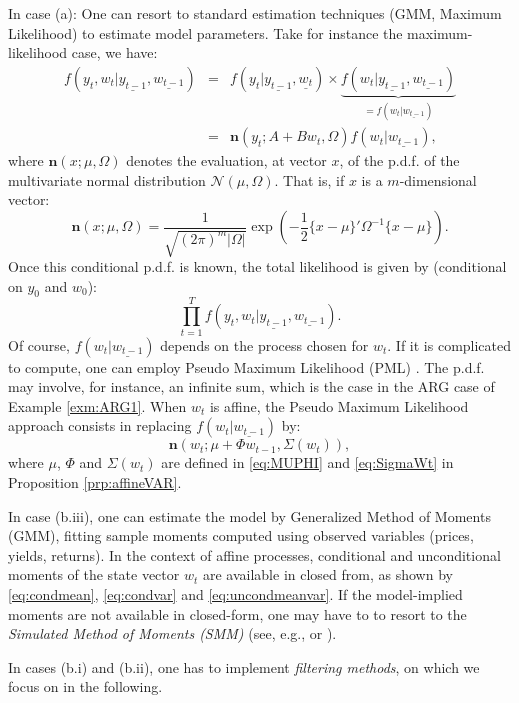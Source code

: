 \documentclass[
  12pt,
]{book}
\theoremstyle{definition}
\theoremstyle{definition}
\theoremstyle{definition}
\theoremstyle{definition}
\theoremstyle{remark}
\begin{document}
In case (a): One can resort to standard estimation techniques (GMM, Maximum Likelihood) to estimate model parameters. Take for instance the maximum-likelihood case, we have:
\begin{eqnarray*}
f(y_t,w_t|\underline{y_{t-1}},\underline{w_{t-1}}) &=& f(y_t|\underline{y_{t-1}},\underline{w_{t}}) \times \underbrace{f(w_t|\underline{y_{t-1}},\underline{w_{t-1}})}_{= f(w_t|\underline{w_{t-1}})}\\
&=& \mathbf{n}(y_t;A + Bw_t,\Omega) f(w_t|\underline{w_{t-1}}),
\end{eqnarray*}
where \(\mathbf{n}(x;\mu,\Omega)\) denotes the evaluation, at vector \(x\), of the p.d.f. of the multivariate normal distribution \(\mathcal{N}(\mu,\Omega)\). That is, if \(x\) is a \(m\)-dimensional vector:
\begin{equation}
\mathbf{n}(x;\mu,\Omega) = \frac{1}{\sqrt{(2 \pi)^{m}|\Omega|}} \exp\left(-\frac{1}{2}\{x - \mu\}'\Omega^{-1}\{x-\mu\}\right).\label{eq:varPHI}
\end{equation}
Once this conditional p.d.f. is known, the total likelihood is given by (conditional on \(y_0\) and \(w_0\)):
\[
\prod_{t=1}^T f(y_t,w_t|\underline{y_{t-1}},\underline{w_{t-1}}).
\]
Of course, \(f(w_t|\underline{w_{t-1}})\) depends on the process chosen for \(w_t\). If it is complicated to compute, one can employ Pseudo Maximum Likelihood (PML) \citep{Gourieroux_Monfort_Trognon_1984}. The p.d.f. may involve, for instance, an infinite sum, which is the case in the ARG case of Example \ref{exm:ARG1}. When \(w_t\) is affine, the Pseudo Maximum Likelihood approach consists in replacing \(f(w_t|\underline{w_{t-1}})\) by:
\[
\mathbf{n}(w_t;\mu + \Phi w_{t-1},\Sigma(w_t)),
\]
where \(\mu\), \(\Phi\) and \(\Sigma(w_t)\) are defined in \eqref{eq:MUPHI} and \eqref{eq:SigmaWt} in Proposition \ref{prp:affineVAR}.

In case (b.iii), one can estimate the model by Generalized Method of Moments (GMM), fitting sample moments computed using observed variables (prices, yields, returns). In the context of affine processes, conditional and unconditional moments of the state vector \(w_t\) are available in closed from, as shown by \eqref{eq:condmean}, \eqref{eq:condvar} and \eqref{eq:uncondmeanvar}. If the model-implied moments are not available in closed-form, one may have to to resort to the \emph{Simulated Method of Moments (SMM)} (see, e.g., \citet{GourMonf96} or \citet{Duffie_Singleton_1993}).

In cases (b.i) and (b.ii), one has to implement \emph{filtering methods}, on which we focus on in the following.
\end{document}

